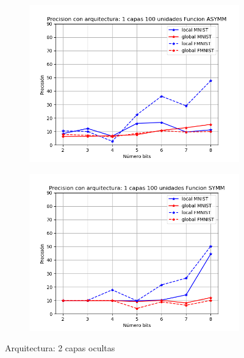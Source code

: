 \begin{figure}[H]
\begin{subfigure}[H]{0.475\textwidth}
    \end{subfigure}
    \begin{subfigure}[H]{0.475\textwidth}
    \includegraphics[width=\textwidth]{imagenes/dni/Precision con arquitectura: 1 capas 100 unidades Funcion ASYMM.png}
    \end{subfigure}
    \begin{subfigure}[H]{0.475\textwidth}
    \includegraphics[width=\textwidth]{imagenes/dni/Precision con arquitectura: 1 capas 100 unidades Funcion SYMM.png}
    \end{subfigure}
    \caption{Arquitectura: 2 capas ocultas}
\end{figure}

